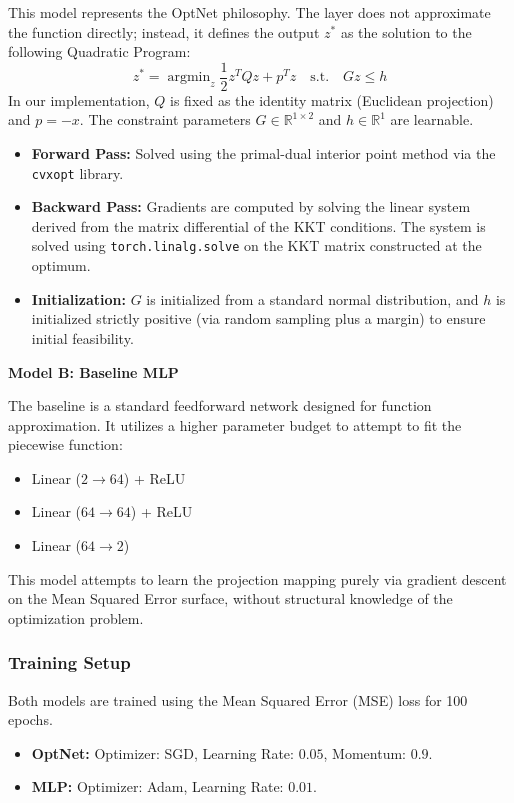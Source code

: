\documentclass{article}
\begin{document}
\begin{appendices}
  This model represents the OptNet philosophy. The layer does not approximate the function directly; instead, it defines the output $z^*$ as the solution to the following Quadratic Program:
  \begin{equation}
    z^* = \mathop{\mathrm{argmin}}_{z} \frac{1}{2}z^T Q z + p^T z \quad \text{s.t.} \quad Gz \le h
  \end{equation}
  In our implementation, $Q$ is fixed as the identity matrix (Euclidean projection) and $p=-x$. The constraint parameters $G \in \mathbb{R}^{1 \times 2}$ and $h \in \mathbb{R}^1$ are learnable.
  \begin{itemize}
    \item \textbf{Forward Pass:} Solved using the primal-dual interior point method via the \texttt{cvxopt} library.
    \item \textbf{Backward Pass:} Gradients are computed by solving the linear system derived from the matrix differential of the KKT conditions. The system is solved using \texttt{torch.linalg.solve} on the KKT matrix constructed at the optimum.
    \item \textbf{Initialization:} $G$ is initialized from a standard normal distribution, and $h$ is initialized strictly positive (via random sampling plus a margin) to ensure initial feasibility.
  \end{itemize}

  \textbf{Model B: Baseline MLP}

  The baseline is a standard feedforward network designed for function approximation. It utilizes a higher parameter budget to attempt to fit the piecewise function:
  \begin{itemize}
    \item Linear ($2 \to 64$) + ReLU
    \item Linear ($64 \to 64$) + ReLU
    \item Linear ($64 \to 2$)
  \end{itemize}
  This model attempts to learn the projection mapping purely via gradient descent on the Mean Squared Error surface, without structural knowledge of the optimization problem.

  \subsubsection{Training Setup}
  Both models are trained using the Mean Squared Error (MSE) loss for 100 epochs.
  \begin{itemize}
    \item \textbf{OptNet:} Optimizer: SGD, Learning Rate: $0.05$, Momentum: $0.9$.
    \item \textbf{MLP:} Optimizer: Adam, Learning Rate: $0.01$.
  \end{itemize}


\end{appendices}
\end{document}
